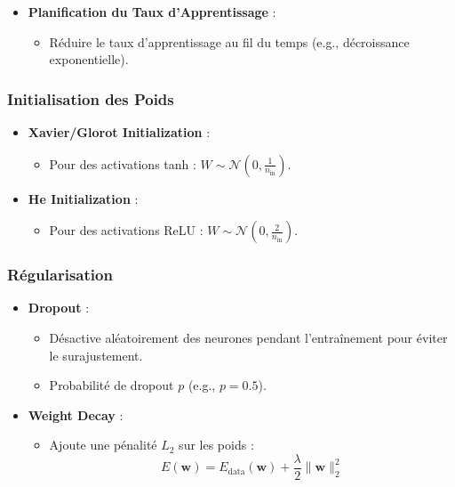\documentclass[a4paper,portrait]{article}
\begin{document}
\begin{multicols}{2}
\begin{itemize}
    \item \textbf{Planification du Taux d'Apprentissage} :
    \begin{itemize}
        \item Réduire le taux d'apprentissage au fil du temps (e.g., décroissance exponentielle).
    \end{itemize}
\end{itemize}



\subsubsection{Initialisation des Poids}

\begin{itemize}
    \item \textbf{Xavier/Glorot Initialization} :
    \begin{itemize}
        \item Pour des activations tanh : \( W \sim \mathcal{N}(0, \frac{1}{n_{\text{in}}}) \).
    \end{itemize}

    \item \textbf{He Initialization} :
    \begin{itemize}
        \item Pour des activations ReLU : \( W \sim \mathcal{N}(0, \frac{2}{n_{\text{in}}}) \).
    \end{itemize}
\end{itemize}



\subsubsection{Régularisation}

\begin{itemize}
    \item \textbf{Dropout} :
    \begin{itemize}
        \item Désactive aléatoirement des neurones pendant l'entraînement pour éviter le surajustement.
        \item Probabilité de dropout \( p \) (e.g., \( p = 0.5 \)).
    \end{itemize}

    \item \textbf{Weight Decay} :
    \begin{itemize}
        \item Ajoute une pénalité \( L_2 \) sur les poids :
        \[
        E(\mathbf{w}) = E_{\text{data}}(\mathbf{w}) + \frac{\lambda}{2} \| \mathbf{w} \|_2^2
        \]
    \end{itemize}
\end{itemize}



\end{multicols}
\end{document}

